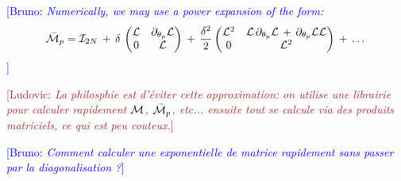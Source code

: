 \documentclass{article}
\newcommand{\B}[1]{{\textcolor{blue}{[Bruno: \textit{#1}]}}}
\renewcommand{\L}[1]{{\textcolor{Brown}{[Ludovic: \textit{#1}]}}}
\begin{document}
\B{Numerically, we may use a power expansion of the form:
$$
\bar{{\mathcal M}}_p
= {\mathcal I}_{2N} \,+\, \delta\, \begin{pmatrix}
    {\mathcal L} &\partial_{\theta_p} {\mathcal L}
    \\
    0&{\mathcal L}
\end{pmatrix} \,+\, \frac{\delta^2}{2}
\begin{pmatrix}
    {\mathcal L}^2 &{\mathcal L}\,\partial_{\theta_p} {\mathcal L} \,+\, \partial_{\theta_p} {\mathcal L}
    {\mathcal L} \\
    0&{\mathcal L}^2
\end{pmatrix} \,+\, \dots
$$
%
}

\L{La philosphie est d'éviter cette approximation: on utilise une librairie pour calculer rapidement ${\mathcal M}$, $\bar{{\mathcal M}}_p$, etc... ensuite tout se calcule via des produits matriciels, ce qui est peu couteux.}

\B{Comment calculer une exponentielle de matrice rapidement sans passer par la diagonalisation ?}





\end{document}
